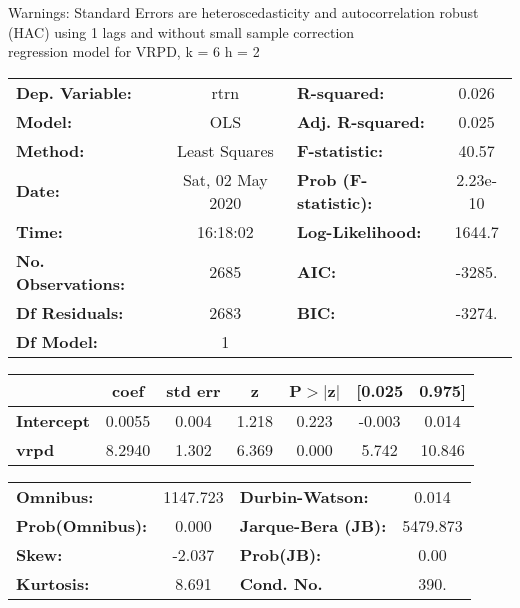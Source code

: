 Warnings: \newline
 [1] Standard Errors are heteroscedasticity and autocorrelation robust (HAC) using 1 lags and without small sample correction\\ 

regression model for VRPD, k = 6 h = 2\begin{center}
\begin{tabular}{lclc}
\toprule
\textbf{Dep. Variable:}    &       rtrn       & \textbf{  R-squared:         } &     0.026   \\
\textbf{Model:}            &       OLS        & \textbf{  Adj. R-squared:    } &     0.025   \\
\textbf{Method:}           &  Least Squares   & \textbf{  F-statistic:       } &     40.57   \\
\textbf{Date:}             & Sat, 02 May 2020 & \textbf{  Prob (F-statistic):} &  2.23e-10   \\
\textbf{Time:}             &     16:18:02     & \textbf{  Log-Likelihood:    } &    1644.7   \\
\textbf{No. Observations:} &        2685      & \textbf{  AIC:               } &    -3285.   \\
\textbf{Df Residuals:}     &        2683      & \textbf{  BIC:               } &    -3274.   \\
\textbf{Df Model:}         &           1      & \textbf{                     } &             \\
\bottomrule
\end{tabular}
\begin{tabular}{lcccccc}
                   & \textbf{coef} & \textbf{std err} & \textbf{z} & \textbf{P$> |$z$|$} & \textbf{[0.025} & \textbf{0.975]}  \\
\midrule
\textbf{Intercept} &       0.0055  &        0.004     &     1.218  &         0.223        &       -0.003    &        0.014     \\
\textbf{vrpd}      &       8.2940  &        1.302     &     6.369  &         0.000        &        5.742    &       10.846     \\
\bottomrule
\end{tabular}
\begin{tabular}{lclc}
\textbf{Omnibus:}       & 1147.723 & \textbf{  Durbin-Watson:     } &    0.014  \\
\textbf{Prob(Omnibus):} &   0.000  & \textbf{  Jarque-Bera (JB):  } & 5479.873  \\
\textbf{Skew:}          &  -2.037  & \textbf{  Prob(JB):          } &     0.00  \\
\textbf{Kurtosis:}      &   8.691  & \textbf{  Cond. No.          } &     390.  \\
\bottomrule
\end{tabular}
\end{center}

